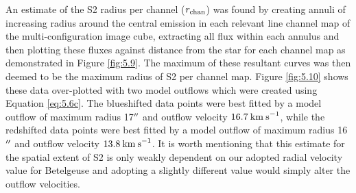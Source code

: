 An estimate of the S2 radius per channel ($r_{\rm{chan}}$) was found by creating annuli of increasing radius around the central emission in each relevant line channel map of the multi-configuration image cube, extracting all flux within each annulus and then plotting these fluxes against distance from the star for each channel map as demonstrated in Figure \ref{fig:5.9}. The maximum of these resultant curves was then deemed to be the maximum radius of S2 per channel map. Figure \ref{fig:5.10} shows these data over-plotted with two model outflows which were created using Equation \ref{eq:5.6c}. The blueshifted data points were best fitted by a model outflow of maximum radius 17$^{\prime\prime}$ and outflow velocity $16.7\>{\rm km\>s}^{-1}$, while the redshifted data points were best fitted by a model outflow of maximum radius 16$^{\prime\prime}$ and outflow velocity $13.8\>{\rm km\>s}^{-1}$. It is worth mentioning that this estimate for the spatial extent of S2 is only weakly dependent on our adopted radial velocity value for Betelgeuse and adopting a slightly different value would simply alter the outflow velocities.

